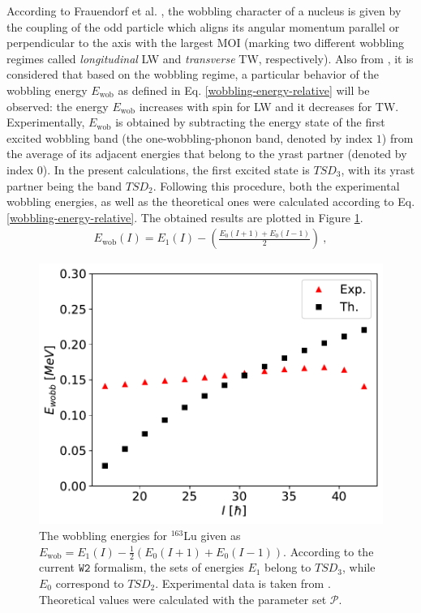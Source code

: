 \documentclass[myclassdoc,debug]{rjparticle}
\begin{document}
According to Frauendorf et al. \cite{frauendorf2014transverse}, the wobbling character of a nucleus is given by the coupling of the odd particle which aligns its angular momentum parallel or perpendicular to the axis with the largest MOI (marking two different wobbling regimes called \emph{longitudinal} LW and \emph{transverse} TW, respectively). Also from \cite{frauendorf2014transverse}, it is considered that based on the wobbling regime, a particular behavior of the wobbling energy $E_\text{wob}$ as defined in Eq. \ref{wobbling-energy-relative} will be observed: the energy $E_\text{wob}$ increases with spin for LW and it decreases for TW. Experimentally, $E_\text{wob}$ is obtained by subtracting the energy state of the first excited wobbling band (the one-wobbling-phonon band, denoted by index $1$) from the average of its adjacent energies that belong to the yrast partner (denoted by index $0$). In the present calculations, the first excited state is $TSD_3$, with its yrast partner being the band $TSD_2$. Following this procedure, both the experimental wobbling energies, as well as the theoretical ones were calculated according to Eq. \ref{wobbling-energy-relative}. The obtained results are plotted in Figure \ref{wobbling-energies_th_exp}.
\begin{align}
    E_\text{wob}(I)=E_{1}(I)-\left(\frac{E_0(I+1)+E_0(I-1)}{2}\right)\ ,
    \label{wobbling-energy-relative}
\end{align}

\begin{figure}
    \centering
    \includegraphics[scale=0.4]{figs/wobbling_energy_ThExp.pdf}
    \caption{The wobbling energies for $^{163}$Lu given as $E_\text{wob}=E_1(I)-\frac{1}{2}(E_0(I+1)+E_0(I-1))$. According to the current $\texttt{W2}$ formalism, the sets of energies $E_1$ belong to $TSD_3$, while $E_0$ correspond to $TSD_2$. Experimental data is taken from \cite{reich2010nuclear}. Theoretical values were calculated with the parameter set $\mathcal{P}$.}
    \label{wobbling-energies_th_exp}
\end{figure}
\end{document}
